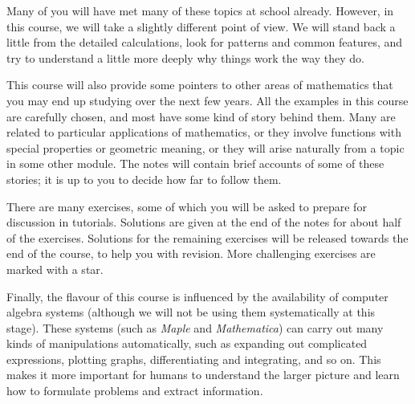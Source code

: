 \documentclass[a4paper]{book}
\newcommand{\PURPLE}[1]{{\color{purple}#1}}
\renewcommand{\:}{\colon}
\newcommand{\mathworld}[1]{}
\newcommand{\DEFN}[1]{\PURPLE{\emph{#1}}}
\theoremstyle{definition}
\begin{document}
Many of you will have met many of these topics at school already.
However, in this course, we will take a slightly different point of
view.  We will stand back a little from the detailed calculations,
look for patterns and common features, and try to understand a little
more deeply why things work the way they do.

This course will also provide some pointers to other areas of
mathematics that you may end up studying over the next few years.  All
the examples in this course are carefully chosen, and most have some
kind of story behind them.  Many are related to particular
applications of mathematics, or they involve functions with special
properties or geometric meaning, or they will arise naturally from a
topic in some other module.  The notes will contain brief accounts of
some of these stories; it is up to you to decide how far to follow
them.  

There are many exercises, some of which you will be asked to prepare
for discussion in tutorials.  Solutions are given at the end of the
notes for about half of the exercises.  Solutions for the remaining
exercises will be released towards the end of the course, to help you
with revision.  More challenging exercises are marked with a star.

Finally, the flavour of this course is influenced by the availability
of computer algebra systems (although we will not be using them
systematically at this stage).  These systems (such as \emph{Maple}
and \emph{Mathematica}) can carry out many kinds of manipulations
automatically, such as expanding out complicated expressions, plotting
graphs, differentiating and integrating, and so on.  This makes it
more important for humans to understand the larger picture and learn
how to formulate problems and extract information.


\end{document}
